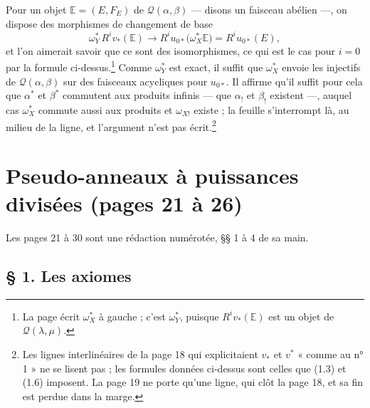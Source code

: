 \documentclass[11pt,a4paper]{article}
\begin{document}
Pour un objet $\mathbb{E} = (E, F_E)$ de $\mathcal{Q}(\alpha, \beta)$ —
disons un faisceau abélien —, on dispose des morphismes de changement de base
\[
\omega_Y^{*}\, R^{i}v_*(\mathbb{E}) \longrightarrow R^{i}u_{0*}\bigl(
\omega_X^{*}\mathbb{E}\bigr) = R^{i}u_{0*}(E),
\]
et l'on aimerait savoir que ce sont des isomorphismes, ce qui est le cas pour
$i = 0$ par la formule ci-dessus.\footnote{La page écrit $\omega_X^{*}$ à
gauche ; c'est $\omega_Y^{*}$, puisque $R^{i}v_*(\mathbb{E})$ est un objet
de $\mathcal{Q}(\lambda,\mu)$.} Comme $\omega_Y^{*}$ est exact, il suffit
que $\omega_X^{*}$ envoie les injectifs de $\mathcal{Q}(\alpha,\beta)$ sur
des faisceaux acycliques pour $u_{0*}$. Il affirme qu'il suffit pour cela que
$\alpha^{*}$ et $\beta^{*}$ commutent aux produits infinis — que $\alpha_!$ et
$\beta_!$ existent —, auquel cas $\omega_X^{*}$ commute aussi aux produits et
$\omega_{X!}$ existe ; la feuille s'interrompt là, au milieu de la ligne, et
l'argument n'est pas écrit.\footnote{Les lignes interlinéaires de la page 18
qui explicitaient $v_*$ et $v^{*}$ « comme au n° 1 » ne se lisent pas ; les
formules données ci-dessus sont celles que (1.3) et (1.6) imposent. La page
19 ne porte qu'une ligne, qui clôt la page 18, et sa fin est perdue dans la
marge.}

\section*{Pseudo-anneaux à puissances divisées (pages 21 à 26)}

Les pages 21 à 30 sont une rédaction numérotée, §§ 1 à 4 de sa main.

\subsection*{§ 1. Les axiomes}
\end{document}
